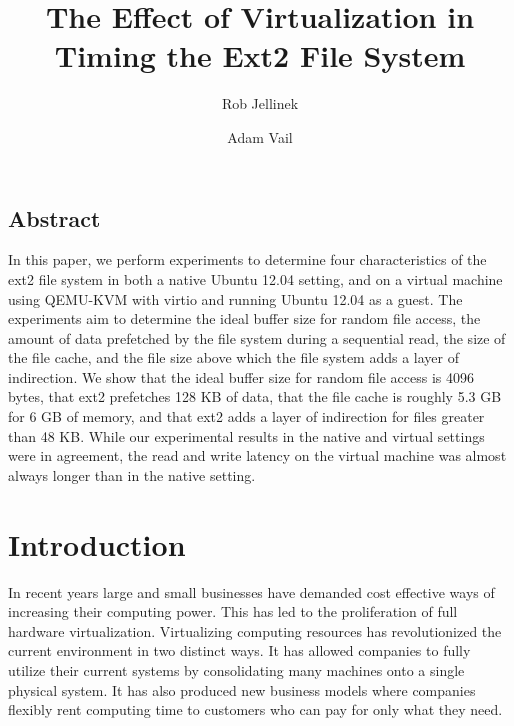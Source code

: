 \documentclass[letterpaper,twocolumn,10pt]{article}
\begin{document}
\date{}
\title{\Large \bf The Effect of Virtualization in Timing the Ext2 File System}
\author{
{\rm Rob Jellinek}\\
\and
{\rm Adam Vail}\\
} %

\maketitle
\thispagestyle{empty}

\subsection*{Abstract}
In this paper, we perform experiments to determine four characteristics of the ext2 file system in both a native Ubuntu 12.04 setting, and on a virtual machine using QEMU-KVM with virtio and running Ubuntu 12.04 as a guest. The experiments aim to determine the ideal buffer size for random file access, the amount of data prefetched by the file system during a sequential read, the size of the file cache, and the file size above which the file system adds a layer of indirection. We show that the ideal buffer size for random file access is 4096 bytes, that ext2 prefetches 128 KB of data, that the file cache is roughly 5.3 GB for 6 GB of memory, and that ext2 adds a layer of indirection for files greater than 48 KB. While our experimental results in the native and virtual settings were in agreement, the read and write latency on the virtual machine was almost always longer than in the native setting.

\section{Introduction}

In recent years large and small businesses have demanded cost effective ways of increasing their computing power.
This has led to the proliferation of full hardware virtualization.
Virtualizing computing resources has revolutionized the current environment in two distinct ways.
It has allowed companies to fully utilize their current systems by consolidating many machines onto a single physical system.
It has also produced new business models where companies flexibly rent computing time to customers who can pay for only what they need.
\end{document}
